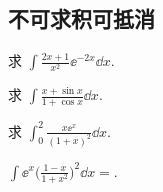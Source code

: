 \subsection{不可求积可抵消}

	\begin{ti}
		求 $\int \frac{2x + 1}{x^{2}} \ee^{-2x} \dd{x}$.
	\end{ti}

	\begin{ti}
		求 $\int \frac{x + \sin x}{1 + \cos x} \dd{x}$.
	\end{ti}

	\begin{ti}
		求 $\int_{0}^{2} \frac{x \ee^{x}}{(1 + x)^{2}} \dd{x}$.
	\end{ti}

	\begin{ti}
		$\int \ee^{x} \bigl( \frac{1 - x}{1 + x^{2}} \bigr)^{2} \dd{x} = $.
	\end{ti}
